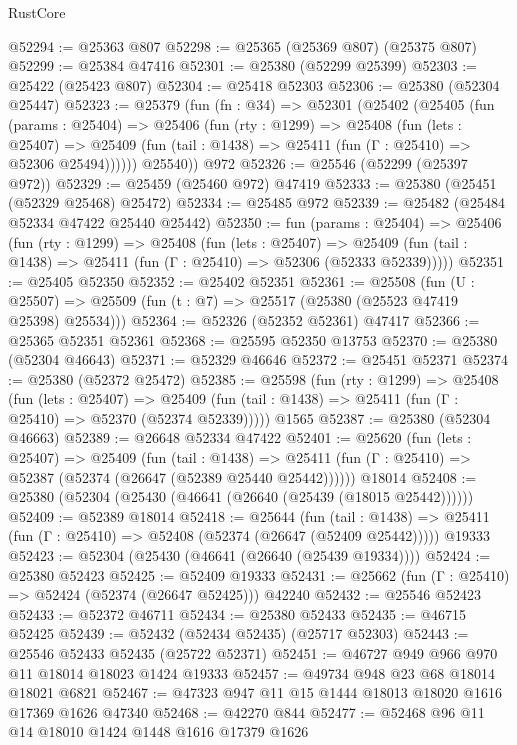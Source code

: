 \begin{lexlean}{RustCore}
\begin{coremodule}
@52294 := @25363 @807
@52298 := @25365 (@25369 @807) (@25375 @807)
@52299 := @25384 @47416
@52301 := @25380 (@52299 @25399)
@52303 := @25422 (@25423 @807)
@52304 := @25418 @52303
@52306 := @25380 (@52304 @25447)
@52323 := @25379
    (fun (fn : @34) =>
    @52301
      (@25402
        (@25405
          (fun (params : @25404) =>
          @25406
            (fun (rty : @1299) =>
            @25408
              (fun (lets : @25407) =>
              @25409 (fun (tail : @1438) => @25411 (fun (Γ : @25410) => @52306 @25494))))))
        @25540))
    @972
@52326 := @25546 (@52299 (@25397 @972))
@52329 := @25459 (@25460 @972) @47419
@52333 := @25380 (@25451 (@52329 @25468) @25472)
@52334 := @25485 @972
@52339 := @25482 (@25484 @52334 @47422 @25440 @25442)
@52350 := fun (params : @25404) =>
  @25406
    (fun (rty : @1299) =>
    @25408
      (fun (lets : @25407) =>
      @25409 (fun (tail : @1438) => @25411 (fun (Γ : @25410) => @52306 (@52333 @52339)))))
@52351 := @25405 @52350
@52352 := @25402 @52351
@52361 := @25508
    (fun (U : @25507) => @25509 (fun (t : @7) => @25517 (@25380 (@25523 @47419 @25398) @25534)))
@52364 := @52326 (@52352 @52361) @47417
@52366 := @25365 @52351 @52361
@52368 := @25595 @52350 @13753
@52370 := @25380 (@52304 @46643)
@52371 := @52329 @46646
@52372 := @25451 @52371
@52374 := @25380 (@52372 @25472)
@52385 := @25598
    (fun (rty : @1299) =>
    @25408
      (fun (lets : @25407) =>
      @25409 (fun (tail : @1438) => @25411 (fun (Γ : @25410) => @52370 (@52374 @52339)))))
    @1565
@52387 := @25380 (@52304 @46663)
@52389 := @26648 @52334 @47422
@52401 := @25620
    (fun (lets : @25407) =>
    @25409
      (fun (tail : @1438) =>
      @25411 (fun (Γ : @25410) => @52387 (@52374 (@26647 (@52389 @25440 @25442))))))
    @18014
@52408 := @25380 (@52304 (@25430 (@46641 (@26640 (@25439 (@18015 @25442))))))
@52409 := @52389 @18014
@52418 := @25644
    (fun (tail : @1438) => @25411 (fun (Γ : @25410) => @52408 (@52374 (@26647 (@52409 @25442)))))
    @19333
@52423 := @52304 (@25430 (@46641 (@26640 (@25439 @19334))))
@52424 := @25380 @52423
@52425 := @52409 @19333
@52431 := @25662 (fun (Γ : @25410) => @52424 (@52374 (@26647 @52425))) @42240
@52432 := @25546 @52423
@52433 := @52372 @46711
@52434 := @25380 @52433
@52435 := @46715 @52425
@52439 := @52432 (@52434 @52435) (@25717 @52303)
@52443 := @25546 @52433 @52435 (@25722 @52371)
@52451 := @46727 @949 @966 @970 @11 @18014 @18023 @1424 @19333
@52457 := @49734 @948 @23 @68 @18014 @18021 @6821
@52467 := @47323 @947 @11 @15 @1444 @18013 @18020 @1616 @17369 @1626 @47340
@52468 := @42270 @844
@52477 := @52468 @96 @11 @14 @18010 @1424 @1448 @1616 @17379 @1626

\end{coremodule}
\end{lexlean}
